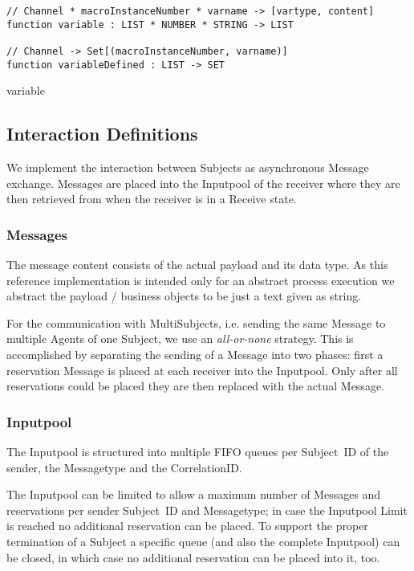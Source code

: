 \begin{listing}[H]
\begin{verbatim}
// Channel * macroInstanceNumber * varname -> [vartype, content]
function variable : LIST * NUMBER * STRING -> LIST

// Channel -> Set[(macroInstanceNumber, varname)]
function variableDefined : LIST -> SET
\end{verbatim}
\caption{variable}
\label{lst:shortasm:variable}
\end{listing}




\subsection{Interaction Definitions}\label{sec:InteractionDefinitions}

We implement the interaction between Subjects as asynchronous Message exchange.
Messages are placed into the Inputpool of the receiver where they are then retrieved from when the receiver is in a Receive state.


\subsubsection{Messages}\label{sec:messages}

The message content consists of the actual payload and its data type. As this
reference implementation is intended only for an abstract process execution we abstract
the payload / business objects to be just a text given as string.

For the communication with MultiSubjects, i.e. sending the same Message to
multiple Agents of one Subject, we use an \textit{all-or-none} strategy. This
is accomplished by separating the sending of a Message into two phases: first
a reservation Message is placed at each receiver into the Inputpool.
Only after all reservations could be placed they are then replaced with the
actual Message.

\subsubsection{Inputpool}\label{sec:Inputpool}

The Inputpool is structured into multiple FIFO queues per Subject~ID of the sender, the Messagetype and the CorrelationID.

The Inputpool can be limited to allow a maximum number of Messages and
reservations per sender Subject~ID and Messagetype; in case the Inputpool Limit is
reached no additional reservation can be placed. To support the proper
termination of a Subject a specific queue (and also the complete Inputpool)
can be closed, in which case no additional reservation can be placed into it,
too.

